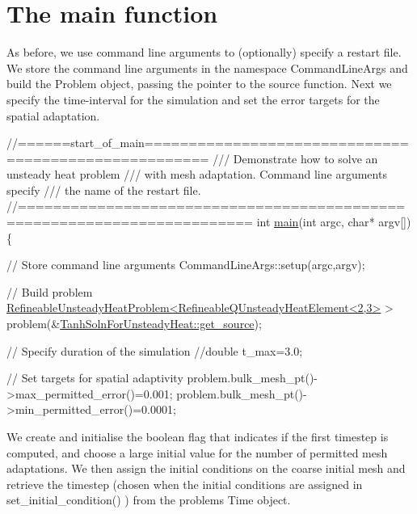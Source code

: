  

\hypertarget{index_main}{}\section{The main function}\label{index_main}
As before, we use command line arguments to (optionally) specify a restart file. We store the command line arguments in the namespace {\ttfamily Command\+Line\+Args} and build the {\ttfamily Problem} object, passing the pointer to the source function. Next we specify the time-\/interval for the simulation and set the error targets for the spatial adaptation.

 
\begin{DoxyCodeInclude}
\textcolor{comment}{//======start\_of\_main=====================================================}
\textcolor{comment}{/// Demonstrate how to solve an unsteady heat problem}
\textcolor{comment}{}\textcolor{comment}{/// with mesh adaptation. Command line arguments specify }
\textcolor{comment}{}\textcolor{comment}{/// the name of the restart file. }
\textcolor{comment}{}\textcolor{comment}{//========================================================================}
\textcolor{keywordtype}{int} \hyperlink{two__d__unsteady__heat__adapt_8cc_a0ddf1224851353fc92bfbff6f499fa97}{main}(\textcolor{keywordtype}{int} argc, \textcolor{keywordtype}{char}* argv[])
\{

 \textcolor{comment}{// Store command line arguments}
 CommandLineArgs::setup(argc,argv);

 \textcolor{comment}{// Build problem}
 \hyperlink{classRefineableUnsteadyHeatProblem}{RefineableUnsteadyHeatProblem<RefineableQUnsteadyHeatElement<2,3>}
       >
  problem(&\hyperlink{namespaceTanhSolnForUnsteadyHeat_aea922a29dfeeb80ef4768def0d6fbde4}{TanhSolnForUnsteadyHeat::get\_source});
   
 \textcolor{comment}{// Specify duration of the simulation}
 \textcolor{comment}{//double t\_max=3.0;}

 \textcolor{comment}{// Set targets for spatial adaptivity}
 problem.bulk\_mesh\_pt()->max\_permitted\_error()=0.001;
 problem.bulk\_mesh\_pt()->min\_permitted\_error()=0.0001;

\end{DoxyCodeInclude}


We create and initialise the boolean flag that indicates if the first timestep is computed, and choose a large initial value for the number of permitted mesh adaptations. We then assign the initial conditions on the coarse initial mesh and retrieve the timestep (chosen when the initial conditions are assigned in {\ttfamily set\+\_\+initial\+\_\+condition()} ) from the problem\textquotesingle{}s {\ttfamily Time} object.


